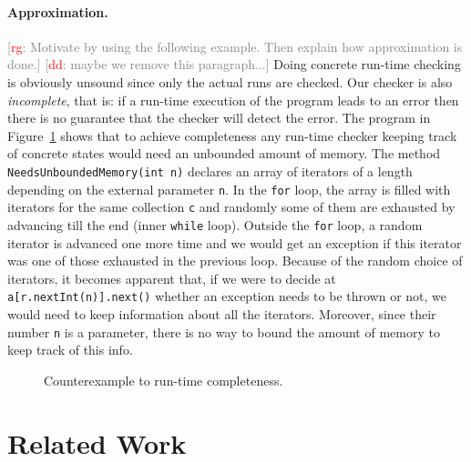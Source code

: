\documentclass[10pt, preprint]{sigplanconf} %
\newcommand{\noterg}[2]{\textcolor{gray}{[\textcolor{red}{#1}: #2]}}
\newcommand{\rg}[1]{\noterg{rg}{#1}}
\newcommand{\dd}[1]{\noterg{dd}{#1}}
\newcommand{\dinocomment}[1]{\dd{#1}}
\begin{document}
\paragraph{Approximation.}
\rg{
Motivate by using the following example.
Then explain how approximation is done.}
\dinocomment{maybe we remove this paragraph...}
Doing concrete run-time checking is obviously unsound since only the actual runs are checked.
Our checker is also {\em incomplete}, that is:
if a run-time execution of the program leads to an error then there is no guarantee that the checker will detect the error.
The program in Figure~\ref{fig:completeness} shows that to achieve completeness any run-time checker keeping track of concrete states would need an unbounded amount of memory.
The method {\tt NeedsUnboundedMemory(int n)}
declares an array of iterators of a length depending on the external parameter {\tt n}.
 In the {\tt for} loop, the array is filled with iterators for the same collection {\tt c} and randomly some of them are exhausted by advancing till the end (inner {\tt while} loop).
Outside the {\tt for} loop, a random iterator is advanced one more time and we would get an exception if this iterator was one of those exhausted in the previous loop.
Because of the random choice of iterators, it becomes apparent that, if we were to decide at {\tt a[r.nextInt(n)].next()} whether an exception needs to be thrown or not, we would need to keep information about all the iterators.
Moreover, since their number {\tt n} is a parameter, there is no way to bound the amount of memory to keep track of this info.

\begin{figure}[t]
\begin{center}

\caption{Counterexample to run-time completeness.}
\label{fig:completeness}
\end{center}
\end{figure}


\section{Related Work}\label{sec:related} %
\end{document}
